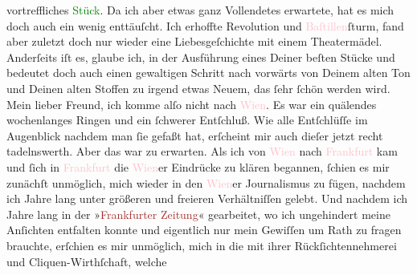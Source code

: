                vortreffliches \textcolor{green}{Stück}{}. Da ich
               aber etwas ganz Vollendetes erwartete, hat es mich doch auch ein wenig enttäuſcht.
               Ich erhoffte Revolution und \textcolor{pink}{Baſtillen}{}\ledrightnote{\textcolor{pink}{Bastille}}ſturm, fand aber
               zuletzt doch nur wieder eine Liebesgeſchichte mit einem Theatermädel. Anderſeits iſt
               es, glaube ich, in der Ausführung eines Deiner beſten Stücke und bedeutet doch \strikeout{\textcolor{gray}{einen}} auch einen gewaltigen Schritt nach vorwärts  von Deinem alten Ton und Deinen alten
               Stoffen zu irgend etwas Neuem, das ſehr ſchön werden wird.\pend
           \pstart
           {\pb}Mein lieber Freund, ich komme alſo nicht nach \textcolor{pink}{Wien}{}\ledrightnote{\textcolor{pink}{Wien}}. Es war ein quälendes wochenlanges Ringen und
               ein ſchwerer Entſchluß. Wie alle Entſchlüſſe im Augenblick nachdem man ſie gefaßt
               hat, erſcheint mir auch dieſer jetzt recht tadelnswerth. Aber das war zu
               erwarten.\pend
           \pstart
           Als ich von \textcolor{pink}{Wien}{}\ledrightnote{\textcolor{pink}{Wien}} nach \textcolor{pink}{Frankfurt}{}\ledrightnote{\textcolor{pink}{Frankfurt am Main}} kam und ſich in \textcolor{pink}{Frankfurt}{}\ledrightnote{\textcolor{pink}{Frankfurt am Main}} die \textcolor{pink}{Wien}{}\ledrightnote{\textcolor{pink}{Wien}}er Eindrücke zu klären
               begannen, ſchien es mir zunächſt unmöglich, mich wieder in den \textcolor{pink}{Wien}{}\ledrightnote{\textcolor{pink}{Wien}}er Journalismus zu fügen, nachdem ich Jahre lang unter
               größeren und freieren Verhältniſſen gelebt. Und nachdem ich Jahre lang in der »\textcolor{brown}{Frankfurter Zeitung}{}\ledrightnote{\textcolor{brown}{Frankfurter Zeitung}}« gearbeitet, wo ich
               ungehindert meine Anſichten entfalten konnte und eigentlich nur mein Gewiſſen um Rath
               zu fragen brauchte, erſchien es mir unmöglich, mich in die \label{K_L02868-2v}\label{K_L02868-2h} mit ihrer Rückſichtennehmerei und Cliquen-Wirthſchaft, welche
